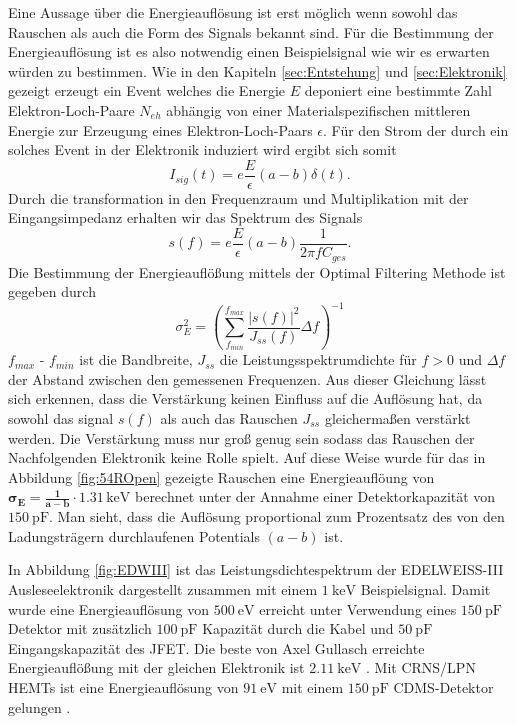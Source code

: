 Eine Aussage über die Energieauflösung ist erst möglich wenn sowohl das Rauschen als auch die Form des Signals bekannt sind.
Für die Bestimmung der Energieauflösung ist es also notwendig einen Beispielsignal wie wir es erwarten würden zu bestimmen.
Wie in den Kapiteln \ref{sec:Entstehung} und \ref{sec:Elektronik} gezeigt erzeugt ein Event welches die Energie $E$ deponiert eine bestimmte Zahl Elektron-Loch-Paare $N_{eh}$ abhängig von einer Materialspezifischen mittleren Energie zur Erzeugung eines Elektron-Loch-Paars $\epsilon$.
Für den Strom der durch ein solches Event in der Elektronik induziert wird ergibt sich somit
\begin{equation}
I_{sig}(t) = e\frac{E}{\epsilon}(a-b)\delta (t).
\end{equation}
Durch die transformation in den Frequenzraum und Multiplikation mit der Eingangsimpedanz erhalten wir das Spektrum des Signals
\begin{equation}
s(f) = e\frac{E}{\epsilon}(a-b)\frac{1}{2\pi f C_{ges}}.
\end{equation}
Die Bestimmung der Energieauflößung mittels der Optimal Filtering Methode ist gegeben durch
\begin{equation}
\sigma^2_E = \left(\sum_{f_{min}}^{f_{max}}\frac{|s(f)|^2}{J_{ss}(f)}\Delta f\right)^{-1}
\label{eq:OptFilt}
\end{equation}
$f_{max}$ - $f_{min}$ ist die Bandbreite, $J_{ss}$ die Leistungsspektrumdichte für $f>0$ und $\Delta f$ der Abstand zwischen den gemessenen Frequenzen.
Aus dieser Gleichung lässt sich erkennen, dass die Verstärkung keinen Einfluss auf die Auflösung hat, da sowohl das signal $s(f)$ als auch das Rauschen $J_{ss}$ gleichermaßen verstärkt werden.
Die Verstärkung muss nur groß genug sein sodass das Rauschen der Nachfolgenden Elektronik keine Rolle spielt.
Auf diese Weise wurde für das in Abbildung \ref{fig:54ROpen} gezeigte Rauschen eine Energieauflöung von $\boldsymbol{\sigma_E = \frac{1}{a-b}\cdot 1.31\,\mathrm{keV}}$ berechnet unter der Annahme einer Detektorkapazität von $\SI{150}{\pico\farad}$.
Man sieht, dass die Auflösung proportional zum Prozentsatz des von den Ladungsträgern durchlaufenen Potentials $(a-b)$ ist.

In Abbildung \ref{fig:EDWIII} ist das Leistungsdichtespektrum der EDELWEISS-III Ausleseelektronik dargestellt zusammen mit einem $\SI{1}{\kilo\electronvolt}$ Beispielsignal.
Damit wurde eine Energieauflösung von $\SI{500}{\electronvolt}$ erreicht\cite{EDWIII} unter Verwendung eines $\SI{150}{\pico\farad}$ Detektor mit zusätzlich $\SI{100}{\pico\farad}$ Kapazität durch die Kabel und $\SI{50}{\pico\farad}$ Eingangskapazität des JFET.
Die beste von Axel Gullasch erreichte Energieauflößung mit der gleichen Elektronik ist $\SI{2.11}{\kilo\electronvolt}$ \cite{Gullasch2015}.
Mit CRNS/LPN HEMTs ist eine Energieauflösung von $\SI{91}{\electronvolt}$ mit einem $\SI{150}{\pico\farad}$ CDMS-Detektor gelungen \cite{Phipps2016}.

